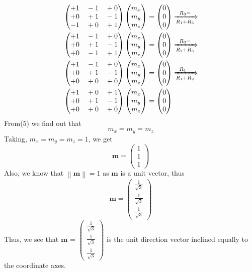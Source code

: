 \documentclass{article}
\newcommand{\myvec}[1]{\ensuremath{\begin{pmatrix}#1\end{pmatrix}}}
\newcommand{\norm}[1]{\left\lVert#1\right\rVert}
\let\vec\mathbf
\begin{document}
\begin{align}
& \myvec{+1 \quad  -1 \quad +0 \\ +0 \quad +1 \quad -1 \\ -1 \quad +0 \quad +1 }\myvec{m_x \\ m_y \\ m_z} = \myvec{0 \\ 0 \\ 0}  \xRightarrow[R_1+R_3]{R_3=} \\
& \myvec{+1 \quad  -1 \quad +0 \\ +0 \quad +1 \quad -1 \\ +0 \quad -1 \quad +1 }\myvec{m_x \\ m_y \\ m_z} = \myvec{0 \\ 0 \\ 0} 
\xRightarrow[R_2+R_3]{R_3=} \\
& \myvec{+1 \quad  -1 \quad +0 \\ +0 \quad +1 \quad -1 \\ +0 \quad +0 \quad +0 }\myvec{m_x \\ m_y \\ m_z} = \myvec{0 \\ 0 \\ 0} 
\xRightarrow[R_1+R_2]{R_1=} \\
& \myvec{+1 \quad  +0 \quad +1 \\ +0 \quad +1 \quad -1 \\ +0 \quad +0 \quad +0 }\myvec{m_x \\ m_y \\ m_z} = \myvec{0 \\ 0 \\ 0}
\end{align}
From($5$) we find out that
\begin{equation*}
m_x = m_y = m_z
\end{equation*}
Taking, $m_x = m_y = m_z =1$, we get
\begin{equation*}
\vec{m} = \myvec{1 \\ 1 \\1}
\end{equation*}
Also, we know that $\norm{\vec{m}}=1$ as $\vec{m}$ is a unit vector, thus
\begin{equation*}
\vec{m} = \myvec{\frac{1}{\sqrt{3}} \\ \frac{1}{\sqrt{3}} \\ \frac{1}{\sqrt{3}}}
\end{equation*}
Thus, we see that  $\vec{m}$ = $\myvec{ \frac{1}{\sqrt{3}} \\ \frac{1}{\sqrt{3}} \\ \frac{1}{\sqrt{3}}}$ is the unit direction vector inclined equally to the coordinate axes.\\
\end{document}
